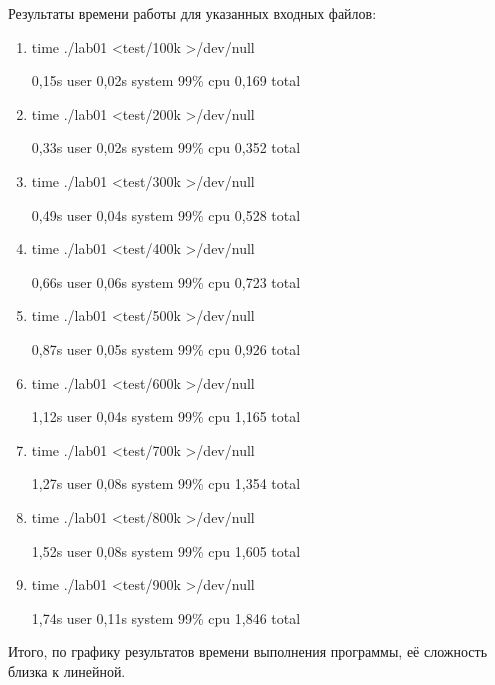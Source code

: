 \documentclass[12pt]{article}
\begin{document}
\smallbreak
\newpage
Результаты времени работы для указанных входных файлов:
\begin{enumerate}
	\item time ./lab01  <test/100k >/dev/null
	
	0,15s user 0,02s system 99\% cpu 0,169 total
	
	\item time ./lab01  <test/200k >/dev/null
	
	0,33s user 0,02s system 99\% cpu 0,352 total
	
	\item time ./lab01  <test/300k >/dev/null
	
	0,49s user 0,04s system 99\% cpu 0,528 total
	
	\item time ./lab01  <test/400k >/dev/null
	
	0,66s user 0,06s system 99\% cpu 0,723 total
	
	\item time ./lab01  <test/500k >/dev/null
	
	0,87s user 0,05s system 99\% cpu 0,926 total
	
	\item time ./lab01  <test/600k >/dev/null
	
	1,12s user 0,04s system 99\% cpu 1,165 total

	\item time ./lab01  <test/700k >/dev/null
	
	1,27s user 0,08s system 99\% cpu 1,354 total
	
	\item time ./lab01  <test/800k >/dev/null
	
	 1,52s user 0,08s system 99\% cpu 1,605 total
	
	\item time ./lab01  <test/900k >/dev/null
	
	1,74s user 0,11s system 99\% cpu 1,846 total
\end{enumerate}


Итого, по графику результатов времени выполнения программы, её сложность близка к линейной.
\newpage
\end{document}
